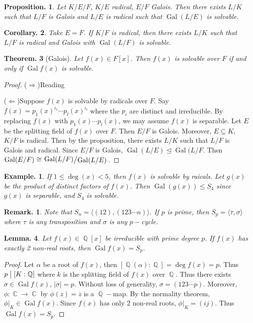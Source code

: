 \documentclass[11pt, a4paper]{memoir}
\DeclareMathOperator{\Q}{{\mathbb{Q}}}
\DeclareMathOperator{\C}{{\mathbb{C}}}
\newcommand{\impr}{{($\Rightarrow$)\hspace{0.2cm}}}
\newcommand{\impl}{{($\Leftarrow$)\hspace{0.2cm}}}
\renewcommand{\div}{\bigm|}
\theoremstyle{change}
\newtheorem{theorem}{Theorem.}[section]
\newtheorem{lemma}[theorem]{Lemma.}
\newtheorem{corollary}[theorem]{Corollary.}
\newtheorem{proposition}[theorem]{Proposition.}
\theoremstyle{plain}
\theoremstyle{nonumberplain}
\newtheorem{example}{Example.}
\newtheorem{remark}{Remark.}
\newtheorem{proof}{Proof}
\DeclareMathOperator{\Gal}{Gal}
\newcommand{\quot}[2]{\mathchoice{\left.\raisebox{0.14em}{$#1$}\middle/\raisebox{-0.14em}{$#2$}\right.}
                                 {\left.\raisebox{0.08em}{$#1$}\middle/\raisebox{-0.08em}{$#2$}\right.}
                                 {\left.\raisebox{0.03em}{$#1$}\middle/\raisebox{-0.03em}{$#2$}\right.}
                                 {\left.\raisebox{0em}{$#1$}\middle/\raisebox{0em}{$#2$}\right.}}
\numberwithin{equation}{section}
\begin{document}
\begin{proposition}
    Let $K/E/F$, $K/E$ radical, $E/F$ Galois.
    Then there exists $L/K$ such that $L/F$ is Galois and $L/E$ is radical such that $\Gal(L/E)$ is solvable.
\end{proposition}
\begin{corollary}
    Take $E=F$.
    If $K/F$ is radical, then there exists $L/K$ such that $L/F$ is radical and Galois with $\Gal(L/F)$ is solvable.
\end{corollary}
\begin{theorem}[Galois]
    Let $f(x)\in F[x]$.
    Then $f(x)$ is solvable over $F$ if and only if $\Gal f(x)$ is solvable.
\end{theorem}
\begin{proof}
    \impr Reading

    \impl Suppose $f(x)$ is solvable by radicals over $F$.
    Say $f(x)=p_1(x)^{i_1}\cdots p_l(x)^{i_l}$ where the $p_i$ are distinct and irreducible.
    By replacing $f(x)$ with $p_1(x)\cdots p_l(x)$, we may assume $f(x)$ is separable.
    Let $E$ be the splitting field of $f(x)$ over $F$.
    Then $E/F$ is Galois.
    Moreover, $E\subseteq K$, $K/F$ is radical.
    Then by the proposition, there exists $L/K$ such that $L/F$ is Galois and radical.
    Since $E/F$ is Galois, $\Gal(L/E)\trianglelefteq\Gal(L/F$.
    Thsn $\Gal(E/F)\cong\quot{\Gal(L/F)}{\Gal(L/E)}$.
\end{proof}
\begin{example}
    If $1\leq\deg (x)<5$, then $f(x)$ is solvable by raicals.
    Let $g(x)$ be the product of distinct factors of $f(x)$.
    Then $\Gal(g(x))\leq S_4$ since $g(x)$ is separable, and $S_4$ is solvable.
\end{example}
\begin{remark}
    Note that $S_n=\langle(12),(123\cdots n)\rangle$.
    If $p$ is prime, then $S_p=\langle\tau,\sigma\rangle$ where $\tau$ is any transposition and $\sigma$ is any $p-$cycle.
\end{remark}
\begin{lemma}
    Let $f(x)\in\Q[x]$ be irreducible with prime degree $p$.
    If $f(x)$ has exactly 2 non-real roots, then $\Gal f(x)=S_p$.
\end{lemma}
\begin{proof}
    Let $\alpha$ be a root of $f(x)$, then $[\Q(\alpha):\Q]=\deg f(x)=p$.
    Thus $p\div[K:\Q]$ where $k$ is the splitting field of $f(x)$ over $\Q$.
    Thus there exists $\sigma\in\Gal f(x)$, $|\sigma|=p$.
    Without loss of generality, $\sigma=(123\cdots p)$.
    Moreover, $\phi:\C\to\C$ by $\phi(z)=\overline{z}$ is a $\Q-$map.
    By the normality theorem, $\phi|_K\in\Gal f(x)$.
    Since $f(x)$ has only 2 non-real roots, $\phi|_K=(ij)$.
    Thus $\Gal f(x)=S_p$.
\end{proof}
\end{document}
